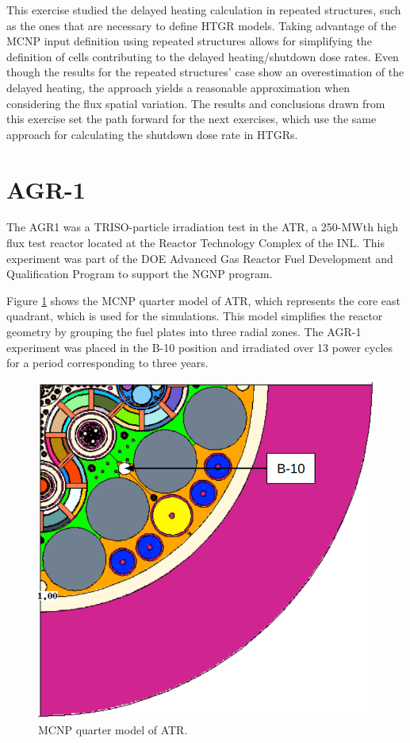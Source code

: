 This exercise studied the delayed heating calculation in repeated structures, such as the ones that are necessary to define HTGR models.
Taking advantage of the MCNP input definition using repeated structures allows for simplifying the definition of cells contributing to the delayed heating/shutdown dose rates.
Even though the results for the repeated structures' case show an overestimation of the delayed heating, the approach yields a reasonable approximation when considering the flux spatial variation.
The results and conclusions drawn from this exercise set the path forward for the next exercises, which use the same approach for calculating the shutdown dose rate in HTGRs.


\section{AGR-1}
\label{sec:agr}


The \gls*{AGR1} \cite{sterbentz_agr1_2018} was a TRISO-particle irradiation test in the \gls*{ATR}, a 250-MWth high flux test reactor located at the Reactor Technology Complex of the \gls*{INL}.
This experiment was part of the \gls*{DOE} Advanced Gas Reactor Fuel Development and Qualification Program to support the \gls*{NGNP} program.

Figure \ref{fig:atrq} shows the MCNP quarter model of ATR, which represents the core east quadrant, which is used for the simulations.
This model simplifies the reactor geometry by grouping the fuel plates into three radial zones.
The AGR-1 experiment was placed in the B-10 position and irradiated over 13 power cycles for a period corresponding to three years.

\begin{figure}[htbp!] %
    \centering
    \includegraphics[width=0.70\linewidth]{figures/atr-quarter2}
    \hfill
    \caption{MCNP quarter model of ATR.}
    \label{fig:atrq}
\end{figure}

